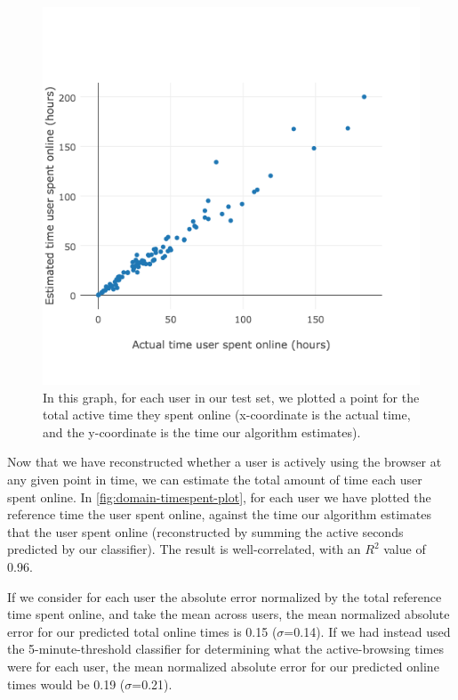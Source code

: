 \documentclass{sigchi}
\begin{document}
\begin{figure}
    \centering
    \includegraphics[width=0.9\columnwidth]{user-timespent-plot}
    \caption{In this graph, for each user in our test set, we plotted a point for the total active time they spent online (x-coordinate is the actual time, and the y-coordinate is the time our algorithm estimates).}
    \label{fig:domain-timespent-plot}
\end{figure}

Now that we have reconstructed whether a user is actively using the browser at any given point in time, we can estimate the total amount of time each user spent online. In \autoref{fig:domain-timespent-plot}, for each user we have plotted the reference time the user spent online, against the time our algorithm estimates that the user spent online (reconstructed by summing the active seconds predicted by our classifier). The result is well-correlated, with an $R^2$ value of 0.96.

If we consider for each user the absolute error normalized by the total reference time spent online, and take the mean across users, the mean normalized absolute error for our predicted total online times is 0.15 ($\sigma$=0.14). If we had instead used the 5-minute-threshold classifier for determining what the active-browsing times were for each user, the mean normalized absolute error for our predicted online times would be 0.19 ($\sigma$=0.21).
\end{document}

